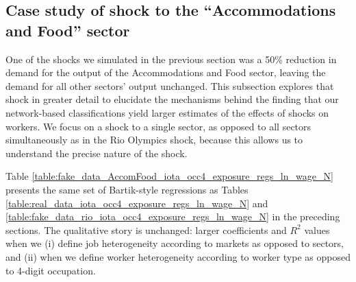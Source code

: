 \documentclass[12pt]{article}
\theoremstyle{definition}
\theoremstyle{plain}
\begin{document}
%
%
%
%
%

\clearpage
\subsection{Case study of shock to the ``Accommodations and Food'' sector}

\label{sec:case_study}


One of the shocks we simulated in the previous section was a 50\% reduction in demand for the output of the Accommodations and Food sector, leaving the demand for all other sectors' output unchanged. This subsection explores that shock in greater detail to elucidate the mechanisms behind the finding that our network-based classifications yield larger estimates of the effects of shocks on workers.  We focus on a shock to a single sector, as opposed to all sectors simultaneously as in the Rio Olympics shock, because this allows us to understand the precise nature of the shock.

% 



Table \ref{table:fake_data_AccomFood_iota_occ4_exposure_regs_ln_wage_N} presents the same set of Bartik-style regressions as Tables \ref{table:real_data_iota_occ4_exposure_regs_ln_wage_N} and \ref{table:fake_data_rio_iota_occ4_exposure_regs_ln_wage_N} in the preceding sections. The qualitative story is unchanged: larger coefficients and $R^2$ values when we (i) define job heterogeneity according to markets as opposed to sectors, and (ii) when we define worker heterogeneity according to worker type as opposed to 4-digit occupation. 
\end{document}
